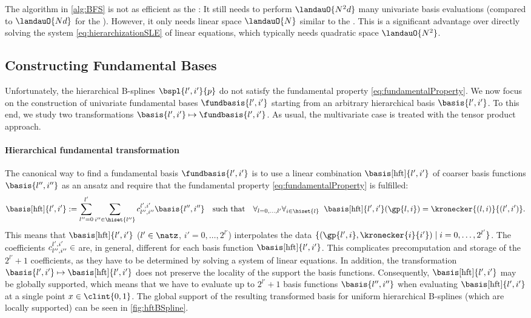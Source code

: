 The \bfs algorithm in \cref{alg:BFS} is not as efficient as the \up:
It still needs to perform $\landauO{N^2 d}$ many univariate
basis evaluations (compared to $\landauO{Nd}$ for the \up).
However, it only needs linear space $\landauO{N}$ similar to the
\up\periodafterPspace.
This is a significant advantage over directly solving the system
\eqref{eq:hierarchizationSLE} of linear equations, which typically
needs quadratic space $\landauO{N^2}$.



\subsection{Constructing Fundamental Bases}
\label{sec:442constructingFundamentalBases}

Unfortunately, the hierarchical B-splines $\bspl{l',i'}{p}$ do not
satisfy the fundamental property \eqref{eq:fundamentalProperty}.
We now focus on the construction of univariate fundamental bases
$\fundbasis{l',i'}$ starting from an
arbitrary hierarchical basis $\basis{l',i'}$.
To this end, we study two transformations
$\basis{l',i'} \mapsto \fundbasis{l',i'}$.
As usual, the multivariate case is treated with the
tensor product approach.

\paragraph{Hierarchical fundamental transformation}

The canonical way to find a fundamental basis $\fundbasis{l',i'}$ is to
use a linear combination $\basis[\hft]{l',i'}$
of coarser basis functions $\basis{l'',i''}$ as an ansatz
and require that the fundamental property \eqref{eq:fundamentalProperty}
is fulfilled:
\begin{equation}
  \label{eq:hierarchicalFundamentalTransformation}
  \basis[\hft]{l',i'}
  := \sum_{l''=0}^{l'} \sum_{i'' \in \hiset{l''}}
  c_{l'',i''}^{l',i'} \basis{l'',i''}
  \quad\text{such that}\quad
  \fafalarge{l = 0, \dotsc, l'}{i \in \hiset{l}}{
    \basis[\hft]{l',i'}(\gp{l,i}) = \kronecker{(l,i)}{(l',i')}.
  }
\end{equation}
This means that
$\basis[\hft]{l',i'}$ ($l' \in \natz$, $i' = 0, \dotsc, 2^{l'}$)
interpolates the data
$\{(\gp{l',i}, \kronecker{i}{i'}) \mid i = 0, \dotsc, 2^{l'}\}$.
The coefficients $c_{l'',i''}^{l',i'} \in \real$
are, in general, different for each basis function $\basis[\hft]{l',i'}$.
This complicates precomputation and storage of the $2^{l'} + 1$ coefficients,
as they have to be determined by solving a system of linear equations.
In addition, the transformation $\basis{l',i'} \mapsto \basis[\hft]{l',i'}$
does not preserve the locality of the support the basis functions.
Consequently, $\basis[\hft]{l',i'}$ may be globally supported,
which means that we have to evaluate up to $2^{l'} + 1$ basis functions
$\basis{l'',i''}$ when evaluating $\basis[\hft]{l',i'}$ at a single point
$x \in \clint{0, 1}$.
The global support of the resulting transformed basis
for uniform hierarchical B-splines (which are locally supported)
can be seen in \cref{fig:hftBSpline}.

